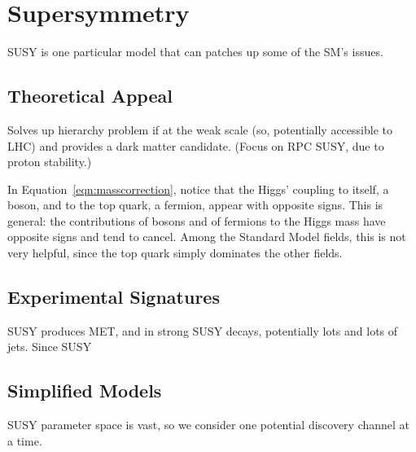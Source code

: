 \section{Supersymmetry} \label{sec:SUSY}

SUSY is one particular model that can patches up some of the SM's issues.

  \subsection{Theoretical Appeal} \label{sec:SUSYappeal}

  Solves up hierarchy problem if at the weak scale (so, potentially accessible to LHC) and provides a dark matter candidate.
  (Focus on RPC SUSY, due to proton stability.)

  In Equation~\ref{eqn:masscorrection}, notice that the Higgs' coupling to itself, a boson, and to the top quark, a fermion, appear with opposite signs.
  This is general: the contributions of bosons and of fermions to the Higgs mass have opposite signs and tend to cancel.
  Among the Standard Model fields, this is not very helpful, since the top quark simply dominates the other fields.
  

  \subsection{Experimental Signatures} \label{sec:SUSYexp}

  SUSY produces MET, and in strong SUSY decays, potentially lots and lots of jets.
  Since SUSY

  \subsection{Simplified Models} \label{sec:SUSYsms}

  SUSY parameter space is vast, so we consider one potential discovery channel at a time.

